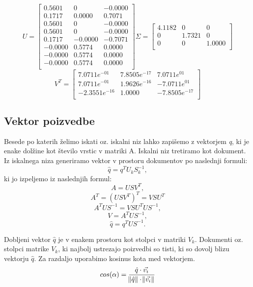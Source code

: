\documentclass{article}
\begin{document}
\[
U = \begin{bmatrix}
    0.5601 &       0 & -0.0000 \\ 
   0.1717 &   0.0000 &  0.7071 \\
   0.5601 &        0 & -0.0000 \\
   0.5601 &        0 & -0.0000 \\
   0.1717 &  -0.0000 & -0.7071 \\
  -0.0000 &   0.5774 &  0.0000 \\
  -0.0000 &   0.5774 &  0.0000 \\
  -0.0000 &   0.5774 &  0.0000 \\
 \end{bmatrix}
\Sigma =
 \begin{bmatrix}
    4.1182 &        0 &        0 \\ 
        0  &   1.7321 &        0 \\
        0  &        0 &   1.0000 \\
 \end{bmatrix}
\]
\[
 V^T = 
 \begin{bmatrix}
     7.0711e^{-01} &   7.8505e^{-17} &  7.0711e^{01} \\ 
     7.0711e^{-01} &   1.9626e^{-16} & -7.0711e^{01} \\
   -2.3551e^{-16} &   1.0000         & -7.8505e^{-17} \\
 \end{bmatrix}
\]


\subsection{Vektor poizvedbe}
\par Besede po katerih želimo iskati oz. iskalni niz lahko zapišemo z vektorjem \textit{q}, ki je enake dolžine kot število vrstic v matriki A. Iskalni niz tretiramo kot dokument. Iz iskalnega niza generiramo vektor v prostoru dokumentov po naslednji formuli:
\[ \hat{q} = q^TU_kS_k^{-1},\]
ki jo izpeljemo iz naslednjih formul:
\[ A = USV^T,\]
\[ A^T = (USV^T)^T = VSU^T\]
\[ A^TUS^{-1} = VSU^TUS^{-1},\]
\[ V = A^TUS^{-1},\]
\[ \hat{q} = q^TUS^{-1}.\]
\par Dobljeni vektor $\hat{q}$ je v enakem prostoru kot stolpci v matriki $V_k$. Dokumenti oz. stolpci matrike $V_k$, ki najbolj ustrezajo poizvedbi so tisti, ki so dovolj blizu vektorju $\hat{q}$. Za razdaljo uporabimo kosinus kota med vektorjem. 
\[ cos(\alpha) = \frac{\hat{q} \cdot \Vec{v_i}}{\norm{\hat{q}} \cdot \norm{\Vec{v_i}}}\]
\end{document}
